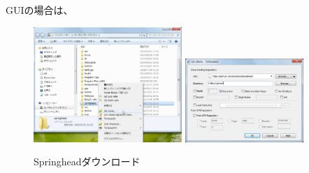 \fi
\medskip
GUI\KLUDGE の場合は、
\begin{narrow}[15pt]
	\begin{figure}[h]
	\begin{center}
	\includegraphics[width=0.5\textwidth]{fig/SpringheadClone1.eps}
	\includegraphics[width=0.4\textwidth]{fig/SpringheadClone2.eps}
	\end{center}
	\caption{Springhead\KLUDGE ダウンロード}
	\label{fig:SpringheadClone}
	\end{figure}
\end{narrow}


